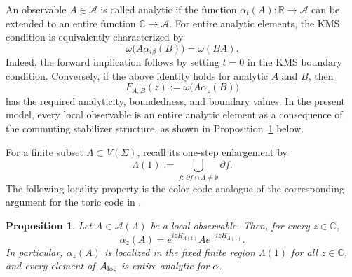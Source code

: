 \documentclass[a4paper,11pt]{article}
\newtheorem{proposition}[theorem]{Proposition}
\theoremstyle{definition}
\theoremstyle{remark}
\theoremstyle{remark}
\begin{document}
An observable $A\in \mathcal{A}$ is called analytic if the function $\alpha_t(A):\mathbb{R} \to \mathcal{A}$ can be extended to an entire function $\mathbb{C}\to \mathcal{A}$. 
For entire analytic elements, the KMS condition is equivalently characterized by
\begin{equation}\label{eq:KMS_analytic}
    \omega\bigl(A\alpha_{i\beta}(B)\bigr)=\omega(BA).
\end{equation}
Indeed, the forward implication follows by setting $t=0$ in the KMS boundary condition. Conversely, if the above identity holds for analytic $A$ and $B$, then
\[
    F_{A,B}(z):=\omega\bigl(A\alpha_z(B)\bigr)
\]
has the required analyticity, boundedness, and boundary values.
In the present model, every local observable is an entire analytic element as a consequence of the commuting stabilizer structure, as shown in Proposition~\ref{prop:exact_locality} below.


For a finite subset $\Lambda\subset V(\Sigma)$, recall its one-step enlargement by
\begin{equation*}
    \Lambda(1) := \bigcup_{f:\,\partial f\cap\Lambda\neq\emptyset}\partial f.
\end{equation*}
The following locality property is the color code analogue of the corresponding argument for the toric code in \cite[Section~2.2.2, (30)--(41)]{alicki2007statistical}.

\begin{proposition}\label{prop:exact_locality}
Let $A\in\mathcal A(\Lambda)$ be a local observable. Then, for every $z\in\mathbb C$,
\begin{equation}\label{eq:complex_dynamics_local}
\alpha_z(A)=e^{izH_{\Lambda(1)}}Ae^{-izH_{\Lambda(1)}}.
\end{equation}
In particular, $\alpha_z(A)$ is localized in the fixed finite region $\Lambda(1)$ for all $z\in\mathbb C$, and every element of $\mathcal A_{\rm loc}$ is entire analytic for $\alpha$.
\end{proposition}
\end{document}
